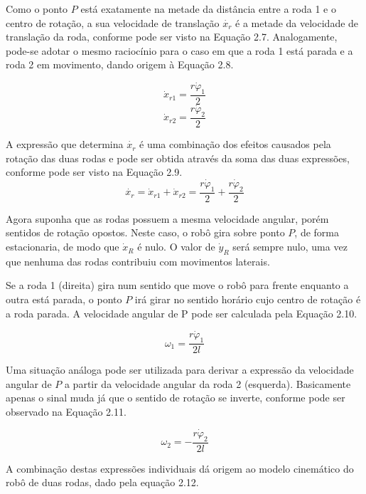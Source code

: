 \documentclass[a4paper]{ifacconf}
\begin{document}
Como o ponto $P$ está exatamente na metade da distância entre a roda 1 e o centro de rotação, a sua velocidade de translação $\dot{x_{r}}$ é a metade da velocidade de translação da roda, conforme pode ser visto na Equação 2.7. Analogamente, pode-se adotar o mesmo raciocínio para o caso em que a roda 1 está parada e a roda 2 em movimento, dando origem à Equação 2.8.

\begin{equation}
\dot{x}_{r1}=\dfrac{r\dot{\varphi}_{1}}{2}
\end{equation}
\begin{equation}
\dot{x}_{r2}=\dfrac{r\dot{\varphi}_{2}}{2}
\end{equation}

A expressão que determina $\dot{x_{r}}$ é uma combinação dos efeitos causados pela rotação das duas rodas e pode ser obtida através da soma das duas expressões, conforme pode ser visto na Equação 2.9.
\begin{equation}
\dot{x_{r}} = \dot{x}_{r1} + \dot{x}_{r2}=\dfrac{r\dot{\varphi}_{1}}{2} + \dfrac{r\dot{\varphi}_{2}}{2}
\end{equation}

Agora suponha que as rodas possuem a mesma velocidade angular, porém sentidos de rotação opostos. Neste caso, o robô gira sobre ponto $P$, de forma estacionaria, de modo que $\dot{x}_{R}$ é nulo. O valor de $\dot{y}_{R}$ será sempre nulo, uma vez que nenhuma das rodas contribuiu com movimentos laterais.

Se a roda 1 (direita) gira num sentido que move o robô para frente enquanto a outra está parada, o ponto $P$ irá girar no sentido horário cujo centro de rotação é a roda parada. A velocidade angular de P pode ser calculada pela Equação 2.10.

\begin{equation}
\omega_{1} = \dfrac{r\dot{\varphi}_{1}}{2l}
\end{equation}

Uma situação análoga pode ser utilizada para derivar a expressão da velocidade angular de $P$ a partir da velocidade angular da roda 2 (esquerda). Basicamente apenas o sinal muda já que o sentido de rotação se inverte, conforme pode ser observado na Equação 2.11.

\begin{equation}
\omega_{2} = -\dfrac{r\dot{\varphi}_{2}}{2l}
\end{equation}

A combinação destas expressões individuais dá origem ao modelo cinemático do robô de duas rodas, dado pela equação 2.12.
\end{document}
